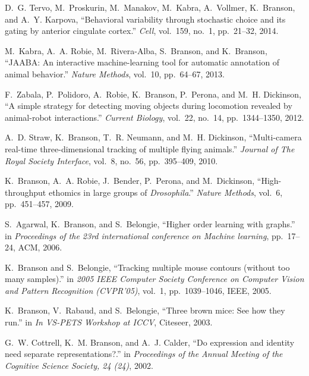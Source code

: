 \begin{cvenum}
\item D.~G. Tervo, M.~Proskurin, M.~Manakov, M.~Kabra, A.~Vollmer, K.~Branson, and
  A.~Y. Karpova, ``Behavioral variability through stochastic choice and its
  gating by anterior cingulate cortex.'' {\em Cell}, vol.~159, no.~1,
  pp.~21--32, 2014.
  
\item M.~Kabra, A.~A. Robie, M.~Rivera-Alba, S.~Branson, and K.~Branson, ``{{JAABA}}:
  An interactive machine-learning tool for automatic annotation of animal
  behavior.'' {\em Nature Methods}, vol.~10, pp.~64--67, 2013.

\item F.~Zabala, P.~Polidoro, A.~Robie, K.~Branson, P.~Perona, and M.~H. Dickinson,
  ``A simple strategy for detecting moving objects during locomotion revealed
  by animal-robot interactions.'' {\em Current Biology}, vol.~22, no.~14,
  pp.~1344--1350, 2012.

\item A.~D. Straw, K.~Branson, T.~R. Neumann, and M.~H. Dickinson, ``Multi-camera
  real-time three-dimensional tracking of multiple flying animals.'' {\em
  Journal of The Royal Society Interface}, vol.~8, no.~56, pp.~395--409, 2010.

\item K.~Branson, A.~A. Robie, J.~Bender, P.~Perona, and M.~Dickinson,
  ``High-throughput ethomics in large groups of \emph{{D}rosophila}.'' {\em
  Nature Methods}, vol.~6, pp.~451--457, 2009.

\item S.~Agarwal, K.~Branson, and S.~Belongie, ``Higher order learning with graphs.''
  in {\em Proceedings of the 23rd international conference on Machine
  learning}, pp.~17--24, ACM, 2006.

\item K.~Branson and S.~Belongie, ``Tracking multiple mouse contours (without too
  many samples).'' in {\em 2005 IEEE Computer Society Conference on Computer
  Vision and Pattern Recognition (CVPR'05)}, vol.~1, pp.~1039--1046, IEEE,
  2005.

\item K.~Branson, V.~Rabaud, and S.~Belongie, ``Three brown mice: See how they run.''
  in {\em In VS-PETS Workshop at ICCV}, Citeseer, 2003.

\item G.~W. Cottrell, K.~M. Branson, and A.~J. Calder, ``Do expression and identity
  need separate representations?.'' in {\em Proceedings of the Annual Meeting
  of the Cognitive Science Society, 24 (24)}, 2002.

\end{cvenum}

